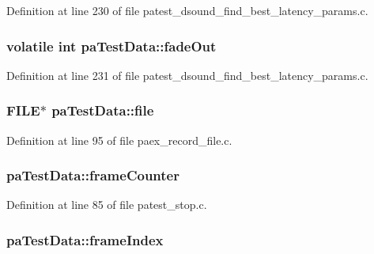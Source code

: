 Definition at line 230 of file patest\+\_\+dsound\+\_\+find\+\_\+best\+\_\+latency\+\_\+params.\+c.

\subsubsection[{\texorpdfstring{fade\+Out}{fadeOut}}]{\setlength{\rightskip}{0pt plus 5cm}volatile {\bf int} pa\+Test\+Data\+::fade\+Out}\hypertarget{structpa_test_data_ae88449a85b022d09a9affdb7c75c1a87}{}\label{structpa_test_data_ae88449a85b022d09a9affdb7c75c1a87}


Definition at line 231 of file patest\+\_\+dsound\+\_\+find\+\_\+best\+\_\+latency\+\_\+params.\+c.

\subsubsection[{\texorpdfstring{file}{file}}]{\setlength{\rightskip}{0pt plus 5cm}F\+I\+LE$\ast$ pa\+Test\+Data\+::file}\hypertarget{structpa_test_data_a623cbc99bbfbc58c30a4aa6e7c945c1d}{}\label{structpa_test_data_a623cbc99bbfbc58c30a4aa6e7c945c1d}


Definition at line 95 of file paex\+\_\+record\+\_\+file.\+c.

\subsubsection[{\texorpdfstring{frame\+Counter}{frameCounter}}]{ pa\+Test\+Data\+::frame\+Counter}\hypertarget{structpa_test_data_a13d8f3219746ef2190d08cf36f8ca401}{}\label{structpa_test_data_a13d8f3219746ef2190d08cf36f8ca401}


Definition at line 85 of file patest\+\_\+stop.\+c.

\subsubsection[{\texorpdfstring{frame\+Index}{frameIndex}}]{ pa\+Test\+Data\+::frame\+Index}\hypertarget{structpa_test_data_ab6998ce9ea16a1cbfd92239f9db30091}{}\label{structpa_test_data_ab6998ce9ea16a1cbfd92239f9db30091}


